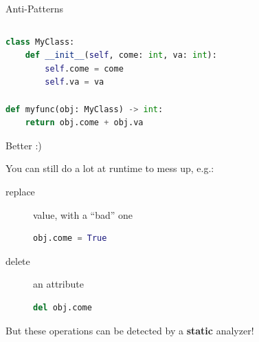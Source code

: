 \documentclass[9pt]{beamer}
\begin{document}
\begin{frame}[fragile]{Anti-Patterns}
\begin{columns}
\begin{column}{0.5\textwidth}
            \begin{lstlisting}[language=Python,style=mystyle]
class MyClass:
    def __init__(self, come: int, va: int):
        self.come = come
        self.va = va

def myfunc(obj: MyClass) -> int:
    return obj.come + obj.va\end{lstlisting}

            Better :)

            You can still do a lot at runtime to mess up, e.g.:
            \begin{description}
                \item[replace] value, with a \enquote{bad} one
                    \begin{lstlisting}[language=Python,style=mystyle]
obj.come = True\end{lstlisting}
                \item[delete] an attribute
                    \begin{lstlisting}[language=Python,style=mystyle]
del obj.come\end{lstlisting}
            \end{description}

            But these operations \alert{can be detected} by a \textbf{static}
            analyzer!
        \end{column}
    \end{columns}
\end{frame}
\end{document}
